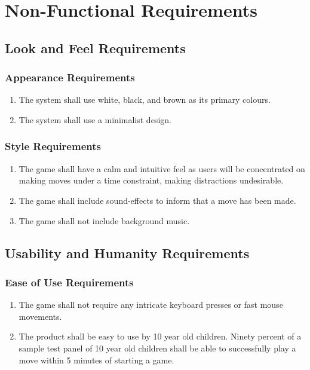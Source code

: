 \documentclass[]{article}
\begin{document}
\section{Non-Functional Requirements}
\label{sec:non-functional_requirements}
\subsection{Look and Feel Requirements}
\label{sub:look_and_feel_requirements}

\subsubsection{Appearance Requirements}
\label{ssub:appearance_requirements}
\begin{enumerate}[{LF}1., leftmargin=2\parindent]
	\item The system shall use white, black, and brown as its primary colours.
	\item The system shall use a minimalist design.
\end{enumerate}

\subsubsection{Style Requirements}
\label{ssub:style_requirements}
\begin{enumerate}[{LF}1., leftmargin=2\parindent, resume]
	\item The game shall have a calm and intuitive feel as users will be concentrated on making moves under a time constraint, making distractions undesirable.
	\item The game shall include sound-effects to inform that a move has been made.
	\item The game shall not include background music.
\end{enumerate}


\subsection{Usability and Humanity Requirements}
\label{sub:usability_and_humanity_requirements}

\subsubsection{Ease of Use Requirements}
\label{ssub:ease_of_use_requirements}
\begin{enumerate}[{UH}1., leftmargin=2\parindent]
    \item The game shall not require any intricate keyboard presses or fast mouse movements. 
    \item The product shall be easy to use by 10 year old children. Ninety percent of a sample test panel of 10 year old children shall be able to successfully play a move within 5 minutes of starting a game.
\end{enumerate}
\end{document}
